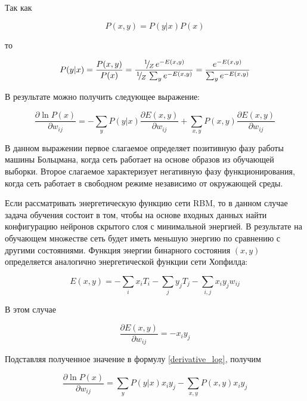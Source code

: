Так как
	
\begin{equation*}
	P(x,y)=P(y \lvert x)P(x)
\end{equation*}
	
то
	
\begin{equation*}
	P(y \lvert x) = \frac{P(x,y)}{P(x)}=\frac{\slantfrac{1}{Z}e^{-E(x,y)}}{\slantfrac{1}{Z}\sum_y e^{-E(x,y)}}=\frac{e^{-E(x,y)}}{\sum_y e^{-E(x,y)}}
\end{equation*}
	
В результате можно получить следующее выражение:
	
\begin{equation}
	\label{derivative_log}
	\frac{\partial \ln P(x)}{\partial w_{ij}}=-\sum_y P(y \lvert x)\frac{\partial E(x,y)}{\partial w_{ij}} + \sum_{x,y} P(x,y)\frac{\partial E(x,y)}{\partial w_{ij}}
\end{equation}
	
В данном выражении первое слагаемое определяет позитивную фазу работы машины Больцмана, когда сеть работает на основе образов из обучающей выборки. Второе слагаемое характеризует негативную фазу функционирования, когда сеть работает в свободном режиме независимо от окружающей среды.

Если рассматривать энергетическую функцию сети RBM, то в данном случае задача обучения состоит в том, чтобы на основе входных данных найти конфигурацию нейронов скрытого слоя с минимальной энергией. В результате на обучающем множестве сеть будет иметь меньшую энергию по сравнению с другими состояниями. Функция энергии бинарного состояния $(x,y)$ определяется аналогично энергетической функции сети Хопфилда:
	
\begin{equation}
	E(x,y)=-\sum_i x_iT_i-\sum_j y_jT_j-\sum_{i,j} x_iy_jw_{ij}
\end{equation}
	
В этом случае
	
\begin{equation*}
	\frac{\partial E(x,y)}{\partial w_{ij}}=-x_iy_j 	
\end{equation*}
	
Подставляя полученное значение в формулу \ref{derivative_log}, получим
	
\begin{equation*}
	\frac{\partial \ln P(x)}{\partial w_{ij}}=\sum_y P(y \lvert x)x_i y_j-\sum_{x,y} P(x,y)x_iy_j
\end{equation*}
	
